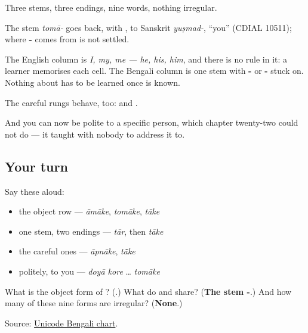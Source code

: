 Three stems, three endings, nine words, nothing irregular.

\begin{cousinweb}
The stem \emph{tomā-} goes back, with \textbf{}, to Sanskrit \emph{yuṣmad-}, \textquotedblleft{}you\textquotedblright{} (CDIAL 10511); where \textbf{-} comes from is not settled.
\end{cousinweb}

\begin{grammarlens}[title={Grammar Lens: what English makes you memorise and Bengali does not}]
The English column is \emph{I, my, me — he, his, him}, and there is no rule in it: a learner memorises each cell. The Bengali column is one stem with \textbf{-} or \textbf{-} stuck on. Nothing about \textbf{} has to be learned once \textbf{} is known.

The careful rungs behave, too: \textbf{} and \textbf{}.

And you can now be polite to a specific person, which chapter twenty-two could not do — it taught \textbf{ } with nobody to address it to.
\end{grammarlens}

\subsection*{Your turn}
Say these aloud:

\begin{itemize}
\raggedright
  \item the object row — \emph{āmāke}, \emph{tomāke}, \emph{tāke}
  \item one stem, two endings — \emph{tār}, then \emph{tāke}
  \item the careful ones — \emph{āpnāke}, \emph{tā̃ke}
  \item politely, to you — \emph{doyā kore} … \emph{tomāke}
\end{itemize}

\begin{tcolorbox}[breakable,colback=teal!4,colframe=teal!35!black,title={Before you move on}]
What is the object form of \textbf{}? (\textbf{}.) What do \textbf{} and \textbf{} share? (\textbf{The stem -}.) And how many of these nine forms are irregular? (\textbf{None}.)

Source: \href{https://www.unicode.org/charts/PDF/U0980.pdf}{Unicode Bengali chart}.
\end{tcolorbox}
